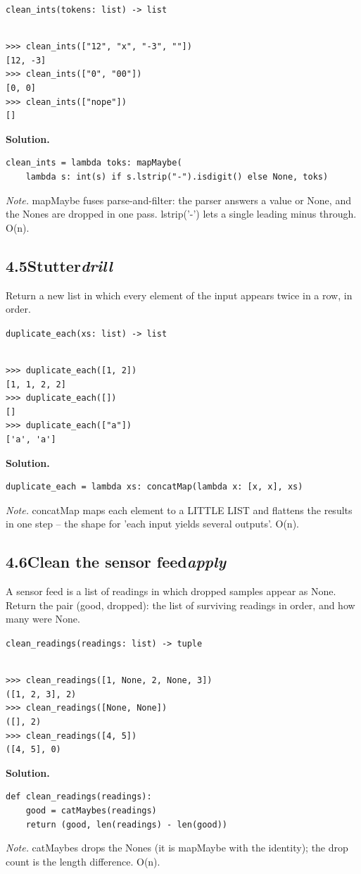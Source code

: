 \documentclass[10pt,letterpaper]{book}
\begin{document}
\noindent\texttt{clean\_ints(tokens: list) -> list}
\begin{lstlisting}[style=ex]

>>> clean_ints(["12", "x", "-3", ""])
[12, -3]
>>> clean_ints(["0", "00"])
[0, 0]
>>> clean_ints(["nope"])
[]

\end{lstlisting}
\noindent\textbf{Solution.}
\begin{lstlisting}[style=code]
clean_ints = lambda toks: mapMaybe(
    lambda s: int(s) if s.lstrip("-").isdigit() else None, toks)
\end{lstlisting}
\noindent\textit{Note.} mapMaybe fuses parse-and-filter: the parser answers a value or None, and the Nones are dropped in one pass. lstrip('-') lets a single leading minus through. O(n).

\subsection*{4.5\quad Stutter\hfill\textnormal{\textit{drill}}}
Return a new list in which every element of the input appears twice in a row, in order.

\noindent\texttt{duplicate\_each(xs: list) -> list}
\begin{lstlisting}[style=ex]

>>> duplicate_each([1, 2])
[1, 1, 2, 2]
>>> duplicate_each([])
[]
>>> duplicate_each(["a"])
['a', 'a']

\end{lstlisting}
\noindent\textbf{Solution.}
\begin{lstlisting}[style=code]
duplicate_each = lambda xs: concatMap(lambda x: [x, x], xs)
\end{lstlisting}
\noindent\textit{Note.} concatMap maps each element to a LITTLE LIST and flattens the results in one step -- the shape for 'each input yields several outputs'. O(n).

\subsection*{4.6\quad Clean the sensor feed\hfill\textnormal{\textit{apply}}}
A sensor feed is a list of readings in which dropped samples appear as None. Return the pair (good, dropped): the list of surviving readings in order, and how many were None.

\noindent\texttt{clean\_readings(readings: list) -> tuple}
\begin{lstlisting}[style=ex]

>>> clean_readings([1, None, 2, None, 3])
([1, 2, 3], 2)
>>> clean_readings([None, None])
([], 2)
>>> clean_readings([4, 5])
([4, 5], 0)

\end{lstlisting}
\noindent\textbf{Solution.}
\begin{lstlisting}[style=code]
def clean_readings(readings):
    good = catMaybes(readings)
    return (good, len(readings) - len(good))
\end{lstlisting}
\noindent\textit{Note.} catMaybes drops the Nones (it is mapMaybe with the identity); the drop count is the length difference. O(n).
\end{document}
